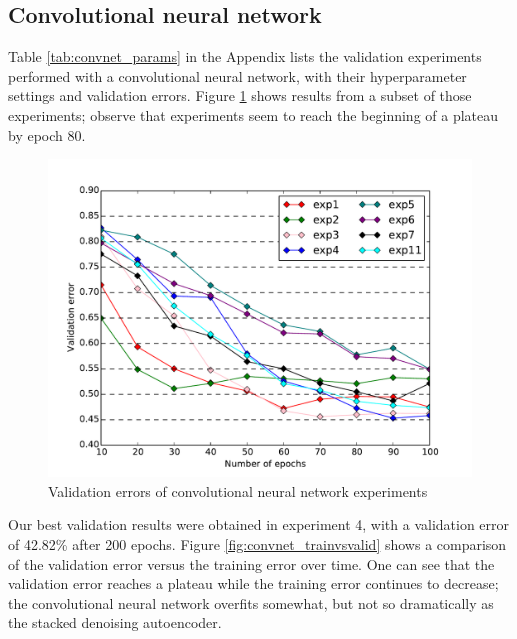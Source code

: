 \documentclass{acm_proc_article-sp}
\begin{document}
\subsection{Convolutional neural network}

Table \ref{tab:convnet_params} in the Appendix lists the validation experiments performed with a convolutional neural network, with their hyperparameter settings and validation errors. Figure \ref{fig:convnet_compare} shows results from a subset of those experiments; observe that experiments seem to reach the beginning of a plateau by epoch 80. 

\begin{figure}[h!]
\includegraphics[width=\linewidth]{convnet_compare.pdf}
		\caption{Validation errors of convolutional neural network experiments}
		\label{fig:convnet_compare}
\end{figure}

Our best validation results were obtained in experiment 4, with a validation error of 42.82\% after 200 epochs. Figure \ref{fig:convnet_trainvsvalid} shows a comparison of the validation error versus the training error over time. One can see that the validation error reaches a plateau while the training error continues to decrease; the convolutional neural network overfits somewhat, but not so dramatically as the stacked denoising autoencoder.
\end{document}
